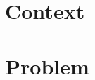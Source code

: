 \documentclass[a4paper,twoside,11pt]{article}
\begin{document}
    

    \section{Context}\label{sec:context}
    

    \section{Problem}\label{sec:problema}
    

    
    
\end{document}
